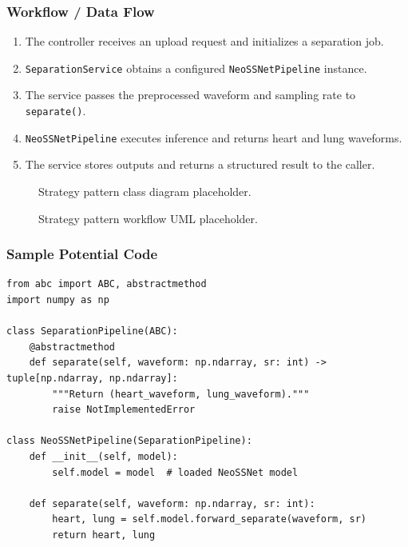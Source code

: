 \documentclass[12pt,a4paper]{report}
\begin{document}
\subsubsection*{Workflow / Data Flow}
\begin{enumerate}[nosep]
  \item The controller receives an upload request and initializes a separation job.
  \item \texttt{SeparationService} obtains a configured \texttt{NeoSSNetPipeline} instance.
  \item The service passes the preprocessed waveform and sampling rate to \texttt{separate()}.
  \item \texttt{NeoSSNetPipeline} executes inference and returns heart and lung waveforms.
  \item The service stores outputs and returns a structured result to the caller.
\end{enumerate}

\begin{figure}[h]
  \centering
  \caption{Strategy pattern class diagram placeholder.}
\end{figure}

\begin{figure}[h]
  \centering
  \caption{Strategy pattern workflow UML placeholder.}
\end{figure}

\subsubsection*{Sample Potential Code}
\begin{lstlisting}[style=pystyle,caption={Strategy abstraction and NeoSSNet implementation.}]
from abc import ABC, abstractmethod
import numpy as np

class SeparationPipeline(ABC):
    @abstractmethod
    def separate(self, waveform: np.ndarray, sr: int) -> tuple[np.ndarray, np.ndarray]:
        """Return (heart_waveform, lung_waveform)."""
        raise NotImplementedError

class NeoSSNetPipeline(SeparationPipeline):
    def __init__(self, model):
        self.model = model  # loaded NeoSSNet model

    def separate(self, waveform: np.ndarray, sr: int):
        heart, lung = self.model.forward_separate(waveform, sr)
        return heart, lung
\end{lstlisting}
\end{document}
